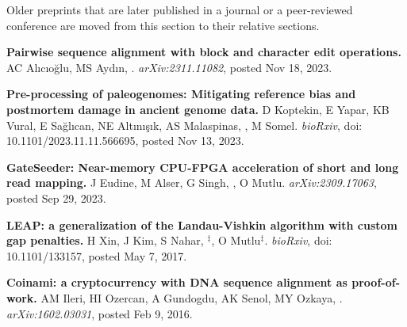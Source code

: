 \small{
Older preprints that are later published in a journal or a peer-reviewed conference are moved from this section to their relative sections.
}

\vspace{-.2cm}
{\bf Pairwise sequence alignment with block and character edit operations.} AC Alıcıoğlu, MS Aydın, \calkan{}.
{\it arXiv:2311.11082}, posted Nov 18, 2023.

\vspace{-.2cm}
{\bf Pre-processing of paleogenomes: Mitigating reference bias and postmortem damage in ancient genome data.}  D Koptekin,  E Yapar,  KB Vural,  E Sağlıcan,  NE Altınışık,  AS Malaspinas,  \calkan,  M Somel.
{\it bioRxiv}, doi: 10.1101/2023.11.11.566695, posted Nov 13, 2023.


\vspace{-.2cm}
{\bf GateSeeder: Near-memory CPU-FPGA acceleration of short and long read mapping.}
J Eudine, M Alser, G Singh, \calkan{}, O Mutlu.
{\it arXiv:2309.17063}, posted Sep 29, 2023.





\vspace{-.2cm}
 {\bf LEAP: a generalization of the Landau-Vishkin algorithm with custom gap penalties.}
 H Xin, J Kim, S Nahar, \calkan{}$^\ddag$, O Mutlu$^\ddag$.
{\it bioRxiv}, doi: 10.1101/133157, posted May 7, 2017.

\vspace{-.2cm}
 {\bf  Coinami: a cryptocurrency with DNA sequence alignment as proof-of-work.}
 AM Ileri, HI Ozercan, A Gundogdu, AK Senol, MY Ozkaya, \calkan{}.
{\it arXiv:1602.03031}, posted Feb 9, 2016.


\vspace{-.4cm}

